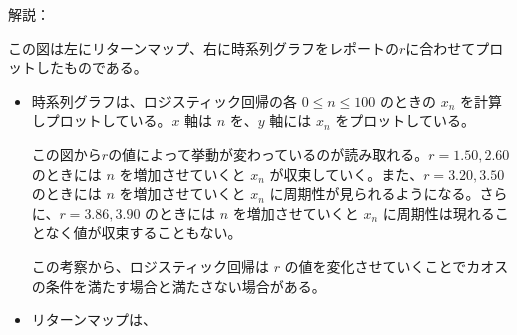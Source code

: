 解説：\par
この図は左にリターンマップ、右に時系列グラフをレポートの$r$に合わせてプロットしたものである。
\begin{itemize}
  \item 時系列グラフは、ロジスティック回帰の各 $0 \leq n \leq 100$ のときの $x_n$ を計算しプロットしている。$x$ 軸は $n$ を、$y$ 軸には $x_n$ をプロットしている。\par
    この図から$r$の値によって挙動が変わっているのが読み取れる。$r = 1.50, 2.60$ のときには $n$ を増加させていくと $x_n$ が収束していく。また、$r = 3.20, 3.50$ のときには $n$ を増加させていくと $x_n$ に周期性が見られるようになる。さらに、$r = 3.86, 3.90$ のときには $n$ を増加させていくと $x_n$ に周期性は現れることなく値が収束することもない。\par
    この考察から、ロジスティック回帰は $r$ の値を変化させていくことでカオスの条件を満たす場合と満たさない場合がある。\par
    
  \item リターンマップは、
\end{itemize}
